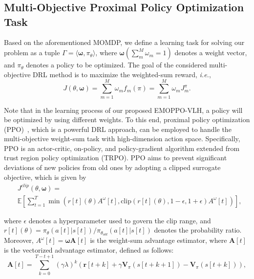 \documentclass[10pt,journal,compsoc]{IEEEtran}
\begin{document}
\subsection{Multi-Objective Proximal Policy Optimization Task}

\par Based on the aforementioned MOMDP, we define a learning task for solving our problem as a tuple $\Gamma = \langle \boldsymbol{\omega}, \pi_{\theta} \rangle$, where $\boldsymbol{\omega} \left ( \sum_m^M \omega_m = 1 \right)$ denotes a weight vector, and $\pi_{\theta}$ denotes a policy to be optimized. The goal of the considered multi-objective DRL method is to maximize the weighted-sum reward, \emph{i.e.}, 
\begin{equation}
    J(\theta, \boldsymbol{\omega}) = \sum_{m=1}^M \omega_m f_m(\pi) = \sum_{m=1}^M \omega_m J_m^{\pi}.
\end{equation} 

\par Note that in the learning process of our proposed EMOPPO-VLH, a policy will be optimized by using different weights. To this end, proximal policy optimization (PPO)~\cite{schulman2017proximal}, which is a powerful DRL approach, can be employed to handle the multi-objective weight-sum task with high-dimension action space. Specifically, PPO is an actor-critic, on-policy, and policy-gradient algorithm extended from trust region policy optimization (TRPO). PPO aims to prevent significant deviations of new policies from old ones by adopting a clipped surrogate objective, which is given by
\begin{equation}
\label{eq:clip}
\begin{aligned}
    & J^{clip}(\theta, \boldsymbol{\omega}) = \\& \mathbb{E} \left[ \sum_{t=1}^T \min \left( r[t](\theta) A^{\omega}[t], \text{clip}(r[t](\theta), 1 - \epsilon, 1 + \epsilon) A^{\omega}[t] \right) \right],
\end{aligned}    
\end{equation}


\noindent where $\epsilon$ denotes a hyperparameter used to govern the clip range, and $r[t](\theta) = {\pi_{\theta} (a[t] | s[t])} / {\pi_{\theta_{old}} (a[t] | s[t])}$ denotes the probability ratio. Moreover, $A^{\omega}[t] = \boldsymbol{\omega A}[t]$ is the weight-sum advantage estimator, where $\boldsymbol{A}[t]$ is the vectorized advantage estimator, defined as follows:
\begin{equation}
    \label{eq:advantage}
    \boldsymbol{A}[t] = \sum_{k=0}^{T-t+1} (\gamma \lambda)^k (\boldsymbol{r}[t+k] + \gamma \boldsymbol{V}_{\pi}(s[t+k+1]) - \boldsymbol{V}_{\pi}(s[t+k])),
\end{equation}
\end{document}
